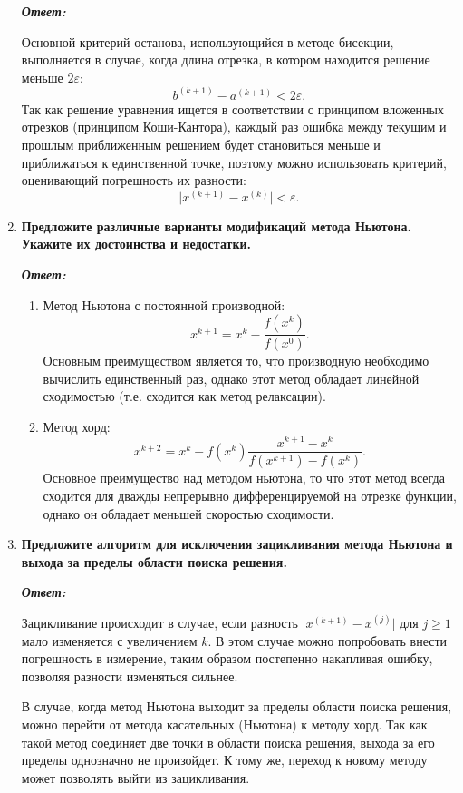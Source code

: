\documentclass[12pt, a4paper]{article}
\newcommand{\abs}[1]{\lvert #1 \rvert}
\begin{document}
\begin{enumerate}
		\textit{\textbf{Ответ:}}

		Основной критерий останова, использующийся в методе бисекции, выполняется в случае, когда длина отрезка, в котором находится решение меньше $2 \varepsilon$:
		\[
		b^{(k+1)} - a^{(k+1)} < 2 \varepsilon.
		\]
		Так как решение уравнения ищется в соответствии с принципом вложенных отрезков (принципом Коши-Кантора), каждый раз ошибка между текущим и прошлым приближенным решением будет становиться меньше и приближаться к единственной точке, поэтому можно использовать критерий, оценивающий погрешность их разности:
		\[
		\abs{x^{(k+1)} - x^{(k)}} < \varepsilon.
		\]

		\item \textbf{Предложите различные варианты модификаций метода Ньютона. Укажите их достоинства и недостатки.}
		\vspace*{0.2cm}
		
		\textit{\textbf{Ответ:}}
		
		\begin{enumerate}
			\item Метод Ньютона с постоянной производной:
			\[
			x^{k+1} = x^k - \dfrac{f(x^k)}{f(x^0)}.
			\]
			Основным преимуществом является то, что производную необходимо вычислить единственный раз, однако этот метод обладает линейной сходимостью (т.е. сходится как метод релаксации).
			\item Метод хорд:
			\[
			x^{k+2} = x^k - f(x^k)\dfrac{x^{k+1} - x^k}{f(x^{k+1}) - f(x^k)}.
			\]
			Основное преимущество над методом ньютона, то что этот метод всегда сходится для дважды непрерывно дифференцируемой на отрезке функции, однако он обладает меньшей скоростью сходимости.
		\end{enumerate}

		\item \textbf{Предложите алгоритм для исключения зацикливания метода Ньютона и выхода за пределы области поиска решения.}
		\vspace*{0.2cm}
		
		\textit{\textbf{Ответ:}}

		Зацикливание происходит в случае, если разность $\abs{x^{(k+1)} - x^{(j)}}$ для $j \geq 1$ мало изменяется с увеличением $k$. В этом случае можно попробовать внести погрешность в измерение, таким образом постепенно накапливая ошибку, позволяя разности изменяться сильнее.

		В случае, когда метод Ньютона выходит за пределы области поиска решения, можно перейти от метода касательных (Ньютона) к методу хорд. Так как такой метод соединяет две точки в области поиска решения, выхода за его пределы однозначно не произойдет. К тому же, переход к новому методу может позволять выйти из зацикливания.
	\end{enumerate}
	
\end{document}
